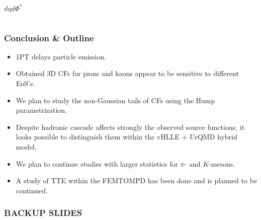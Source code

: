 \documentclass[dvipsnames] {beamer}
\begin{document}
\begin{frame}
\begin{columns}[c]
\begin{block}{\bf \centering $d\eta d\Phi^{*}$}
\begin{figure}[H]
      \end{figure}
   \end{block}
  \end{columns}
\end{frame}

\begin{frame}
  \bf 
  \frametitle{Conclusion \& Outline}
  \bf \centering 
  \begin{itemize}
  \item 1PT delays particle emission.  
  \item Obtained 3D CFs for pions and kaons appear to be sensitive to different EoS's.
  \item We plan to study the non-Gaussian tails of CFs using the Hump parametrization.
  \item Despite hadronic cascade affects strongly the observed source functions, it looks possible to distinguish them within the vHLLE + UrQMD hybrid model.
  \item We plan to continue studies with larger statistics for $\pi$- and $K$-mesons.
  \item A study of TTE within the FEMTOMPD has been done
 and is planned to be continued.
  \end{itemize}
\end{frame}



\begin{frame}
  \bf
  \frametitle{\bf \centering BACKUP SLIDES}
\end{frame}
\end{document}
